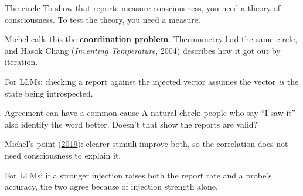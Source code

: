 \documentclass[aspectratio=169,11pt]{beamer}
\begin{document}
\begin{frame}[label=circle]{The circle}
To show that reports measure consciousness, you need a theory of consciousness. To test the theory, you need a measure.

\vspace{0.4em}
\begin{center}
\end{center}

\vspace{0.3em}
Michel calls this the \textbf{coordination problem}. Thermometry had the same circle, and Hasok Chang (\emph{Inventing Temperature}, 2004) describes how it got out by iteration.

\vspace{0.3em}
{\small For LLMs: checking a report against the injected vector assumes the vector \emph{is} the state being introspected.}
\end{frame}

\begin{frame}[label=commoncause]{Agreement can have a common cause}
A natural check: people who say ``I saw it'' also identify the word better. Doesn't that show the reports are valid?

\vspace{0.5em}
\begin{center}
\end{center}

\vspace{0.2em}
Michel's point (\href{https://philpapers.org/archive/MICTMO-15.pdf}{2019}): clearer stimuli improve both, so the correlation does not need consciousness to explain it.

\vspace{0.3em}
{\small For LLMs: if a stronger injection raises both the report rate and a probe's accuracy, the two agree because of injection strength alone.}
\end{frame}
\end{document}
